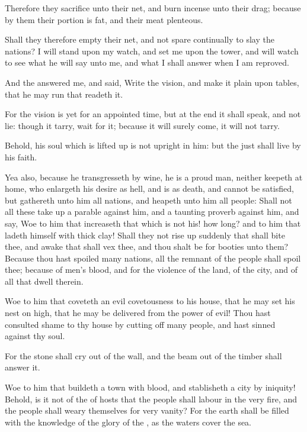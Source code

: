 \Verse Therefore they sacrifice unto their net, and burn incense unto their drag; because by them their portion is fat, and their meat plenteous.

\Verse Shall they therefore empty their net, and not spare continually to slay the nations?  
\Chapter
\Verse I will stand upon my watch, and set me upon the tower, and will watch to see what he will say unto me, and what I shall answer when I am reproved.

\Verse And the \LORD answered me, and said, Write the vision, and make it plain upon tables, that he may run that readeth it.

\Verse For the vision is yet for an appointed time, but at the end it shall speak, and not lie: though it tarry, wait for it; because it will surely come, it will not tarry.

\Verse Behold, his soul which is lifted up is not upright in him: but the just shall live by his faith.

\Verse Yea also, because he transgresseth by wine, he is a proud man, neither keepeth at home, who enlargeth his desire as hell, and is as death, and cannot be satisfied, but gathereth unto him all nations, and heapeth unto him all people: \Verse Shall not all these take up a parable against him, and a taunting proverb against him, and say, Woe to him that increaseth that which is not his! how long? and to him that ladeth himself with thick clay!  \Verse Shall they not rise up suddenly that shall bite thee, and awake that shall vex thee, and thou shalt be for booties unto them?  \Verse Because thou hast spoiled many nations, all the remnant of the people shall spoil thee; because of men's blood, and for the violence of the land, of the city, and of all that dwell therein.

\Verse Woe to him that coveteth an evil covetousness to his house, that he may set his nest on high, that he may be delivered from the power of evil!  \Verse Thou hast consulted shame to thy house by cutting off many people, and hast sinned against thy soul.

\Verse For the stone shall cry out of the wall, and the beam out of the timber shall answer it.

\Verse Woe to him that buildeth a town with blood, and stablisheth a city by iniquity!  \Verse Behold, is it not of the \LORD of hosts that the people shall labour in the very fire, and the people shall weary themselves for very vanity?  \Verse For the earth shall be filled with the knowledge of the glory of the \LORD, as the waters cover the sea.

